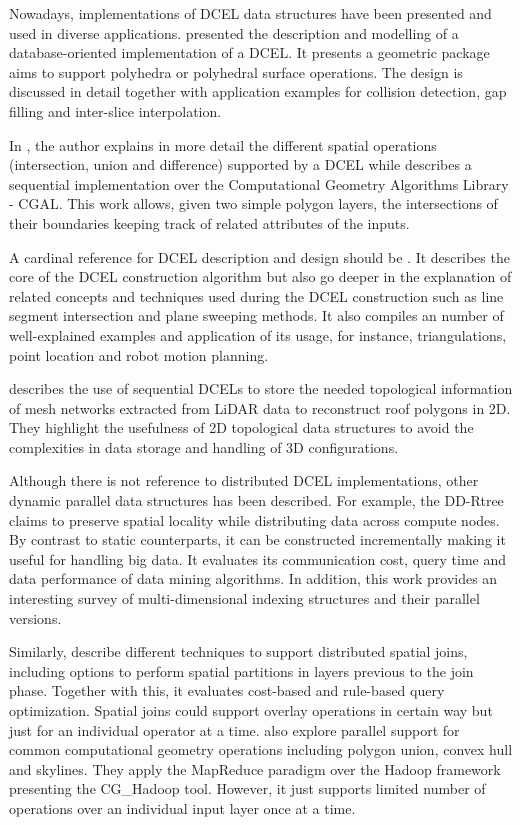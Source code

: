 Nowadays, implementations of DCEL data structures have been presented and used in diverse applications.  \cite{barequet_dcel_1998} presented the description and modelling of a database-oriented implementation of a DCEL. It presents a geometric package aims to support polyhedra or polyhedral surface operations.  The design is discussed in detail together with application examples for collision detection, gap filling and inter-slice interpolation.

In \cite{freiseisen_colored_1998}, the author explains in more detail the different spatial operations (intersection, union and difference) supported by a DCEL while describes a sequential implementation over the Computational Geometry Algorithms Library - CGAL.  This work allows, given two simple polygon layers, the intersections of their boundaries keeping track of related attributes of the inputs.  

A cardinal reference for DCEL description and design should be \cite{berg_computational_2008}.  It describes the core of the DCEL construction algorithm but also go deeper in the explanation of related concepts and techniques used during the DCEL construction such as line segment intersection and plane sweeping methods.  It also compiles an number of well-explained examples and application of its usage, for instance, triangulations, point location and robot motion planning.

\cite{boltcheva_topological-based_2020} describes the use of sequential DCELs to store the needed topological information of mesh networks extracted from LiDAR data to reconstruct roof polygons in 2D.  They highlight the usefulness of 2D topological data structures to avoid the complexities in data storage and handling of 3D configurations.

Although there is not reference to distributed DCEL implementations, other dynamic parallel data structures has been described.  For example, the DD-Rtree \cite{challa_dd-rtree_2016} claims to preserve spatial locality while distributing data across compute nodes.  By contrast to static counterparts, it can be constructed incrementally making it useful for handling big data.  It evaluates its communication cost, query time and data performance of data mining algorithms.  In addition, this work provides an interesting survey of multi-dimensional indexing structures and their parallel versions.

Similarly, \cite{sabek_spatial_2017} describe different techniques to support distributed spatial joins, including options to perform spatial partitions in layers previous to the join phase.  Together with this, it evaluates cost-based and rule-based query optimization.  Spatial joins could support overlay operations in certain way but just for an individual operator at a time.  \cite{li_scalable_2019} also explore parallel support for common computational geometry operations including polygon union, convex hull and skylines.  They apply the MapReduce paradigm over the Hadoop framework presenting the CG\_Hadoop tool.  However, it just supports limited number of operations over an individual input layer once at a time.

